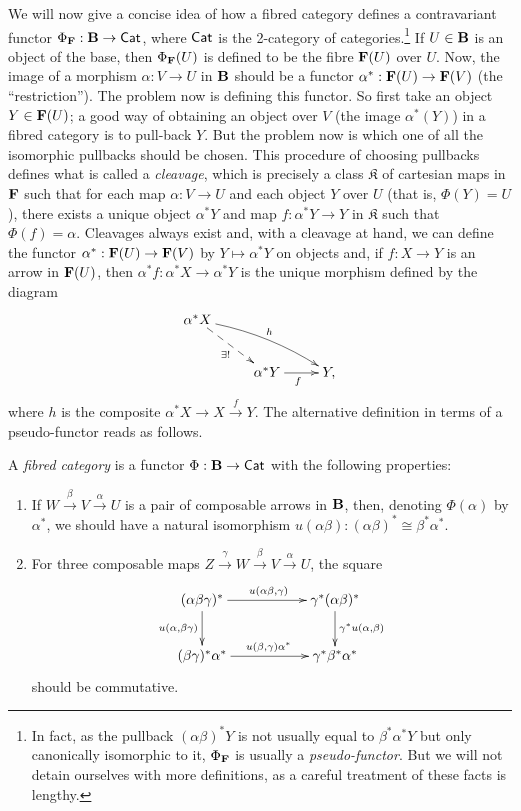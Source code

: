 We will now give a concise idea of how a fibred category defines a contravariant functor $\Phi_{{\bf F}}:{\bf B}\to \mathsf{Cat}$, where $\mathsf{Cat}$ is the 2-category of categories.\footnote{In fact, as the pullback $(\alpha \beta)^*Y$ is not usually equal to $\beta^*\alpha^*Y$ but only canonically isomorphic to it, $\Phi_{{\bf F}}$ is usually a \emph{pseudo-functor}. But we will not detain ourselves with more definitions, as a careful treatment of these facts is lengthy.} If $U\in {\bf B}$ is an object of the base, then $\Phi_{{\bf F}}(U)$ is defined to be the fibre ${\bf F}(U)$ over $U$. Now, the image of a morphism $\alpha :V\to U$ in ${\bf B}$ should be a functor $\alpha^*:{\bf F}(U)\to {\bf F}(V)$ (the ``restriction''). The problem now is defining this functor. So first take an object $Y\in {\bf F}(U)$; a good way of obtaining an object over $V$ (the image $\alpha^*(Y)$) in a fibred category is to pull-back $Y$. But the problem now is which one of all the isomorphic pullbacks should be chosen. This procedure of choosing pullbacks defines what is called a \emph{cleavage}, which is precisely a class $\mathfrak{K}$ of cartesian maps in ${\bf F}$ such that for each map $\alpha :V\to U$ and each object $Y$ over $U$ (that is, $\Phi (Y)=U$), there exists a unique object $\alpha^*Y$ and map $f:\alpha^*Y\to Y$ in $\mathfrak{K}$ such that $\Phi (f)=\alpha$. Cleavages always exist \cite{Vistoli:descent} and, with a cleavage at hand, we can define the functor $\alpha^* :{\bf F}(U)\to {\bf F}(V)$ by $Y\mapsto \alpha^*Y$ on objects and, if $f:X\to Y$ is an arrow in ${\bf F}(U)$, then $\alpha^*f:\alpha^*X\to \alpha^*Y$ is the unique morphism defined by the diagram
$$
\xymatrix{
   \alpha^*X\ar@{-->}[rd]_{\exists !} \ar@/^/[rrd]^{h} & & \\
   & \alpha^*Y\ar[r]_{f} & Y, }
$$
where $h$ is the composite $\alpha^*X\to X\stackrel{f}{\to}Y$. The alternative definition in terms of a pseudo-functor reads as follows.

\begin{defi}\label{fib_cat_2}
A \emph{fibred category} is a functor $\Phi :{\bf B}\to \mathsf{Cat}$ with the following properties:
\begin{enumerate}
\item If $W\stackrel{\beta}{\rightarrow}V\stackrel{\alpha}{\rightarrow}U$ is a pair of composable arrows in ${\bf B}$, then, denoting $\Phi (\alpha )$ by $\alpha^*$, we should have a natural isomorphism $u({\alpha \beta}):(\alpha \beta )^*\cong \beta^*\alpha^*$.
\item For three composable maps $Z\stackrel{\gamma}{\rightarrow}W\stackrel{\beta}{\rightarrow}V\stackrel{\alpha}{\rightarrow}U$, the square
$$
\xymatrix{
(\alpha \beta \gamma )^* \ar[rr]^{u(\alpha \beta ,\gamma )}\ar[d]_{u(\alpha ,\beta \gamma )} & & \gamma^* (\alpha \beta )^* \ar[d]^{\gamma^*u(\alpha ,\beta )} \\
(\beta \gamma )^*\alpha^* \ar[rr]^{u(\beta ,\gamma )\alpha^*}  & & \gamma^*\beta^*\alpha^* }
$$
should be commutative.
\end{enumerate}
\end{defi}

